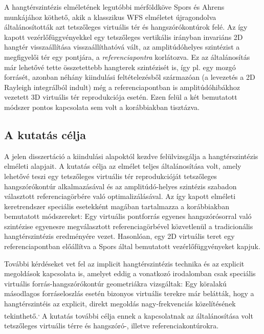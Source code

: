 \documentclass[10pt,twoside]{article}
\theoremstyle{thesisgroupstyle}
\theoremstyle{indented}
\begin{document}
A hangtérszintézis elméletének legutóbbi mérföldköve Spors és Ahrens munkájához köthető, akik a klasszikus WFS elméletet újragondolva általánosították azt tetszőleges virtuális tér és hangszórókontúrok felé.
Az így kapott vezérlőfüggvényekkel egy tetszőleges vertikális irányban invariáns 2D hangtér visszaállítása visszaállíthatóvá vált, az amplitúdóhelyes szintézist a megfigyelői tér egy pontjára, a \emph{referenciapontra} korlátozva.
Ez az általánosítás már lehetővé tette összetettebb hangterek szintézisét is, így pl. egy mozgó forrásét, azonban néhány kiindulási feltételezésből származóan (a levezetés a 2D Rayleigh integrálból indult) még a referenciapontban is amplitúdóhibákhoz vezetett 3D virtuális tér reprodukciója esetén.
Ezen felül a két bemutatott módszer pontos kapcsolata sem volt a korábbiakban tisztázva.

\subsection{A kutatás célja}

A jelen disszertáció a kiindulási alapoktól kezdve felülvizsgálja a hangtérszintézis elméleti alapjait. 
A kutatás célja az elmélet teljes általánosítása volt, amely lehetővé teszi egy tetszőleges virtuális tér reprodukcióját tetszőleges hangszórókontúr alkalmazásával és az amplitúdó-helyes szintézis szabadon választott referenciagörbére való optimalizálásával.
Az így kapott elméleti keretrendszer speciális esetekként magában tartalmazza a korábbiakban bemutatott módszereket: 
Egy virtuális pontforrás egyenes hangszórósorral való szintézise egyenesre megválasztott referenciagörbével közvetlenül a tradicionális hangtérszintézis eredményére vezet.
Hasonlóan, egy 2D virtuális teret egy referenciapontban előállítva a Spors által bemutatott vezérlőfüggvényeket kapjuk. 

További kérdéseket vet fel az implicit hangtérszintézis technika és az explicit megoldások kapcsolata is, amelyet eddig a vonatkozó irodalomban csak speciális virtuális forrás-hangszórókontúr geometriákra vizsgáltak:
Egy köralakú másodlagos forráseloszlás esetén bizonyos virtuális terekre már belátták, hogy a hangtérszintéis az explicit, direkt megoldás nagy-frekvenciás közelítésének tekinthető.\textsuperscript{,}
A kutatás további célja ennek a kapcsolatnak az általánosítása volt tetszőleges virtuális térre és hangszóró-, illetve referenciakontúrokra.
\end{document}
